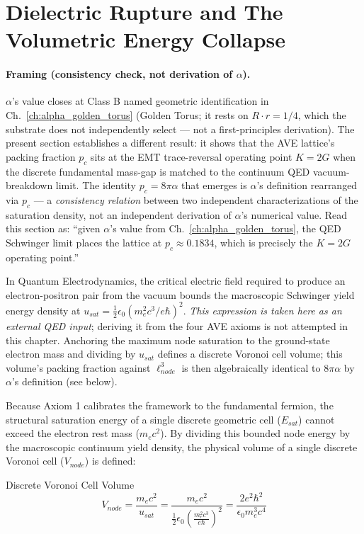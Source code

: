 \section{Dielectric Rupture and The Volumetric Energy Collapse}
\label{sec:dielectric_rupture}

\paragraph{Framing (consistency check, not derivation of $\alpha$).} $\alpha$'s value closes at Class B named geometric identification in Ch.~\ref{ch:alpha_golden_torus} (Golden Torus; it rests on $R \cdot r = 1/4$, which the substrate does not independently select --- not a first-principles derivation). The present section establishes a different result: it shows that the AVE lattice's packing fraction $p_c$ sits at the EMT trace-reversal operating point $K = 2G$ when the discrete fundamental mass-gap is matched to the continuum QED vacuum-breakdown limit. The identity $p_c = 8\pi\alpha$ that emerges is $\alpha$'s definition rearranged via $p_c$ --- a \emph{consistency relation} between two independent characterizations of the saturation density, not an independent derivation of $\alpha$'s numerical value. Read this section as: ``given $\alpha$'s value from Ch.~\ref{ch:alpha_golden_torus}, the QED Schwinger limit places the lattice at $p_c \approx 0.1834$, which is precisely the $K=2G$ operating point.''

In Quantum Electrodynamics, the critical electric field required to produce an electron-positron pair from the vacuum bounds the macroscopic Schwinger yield energy density at $u_{sat} = \frac{1}{2} \epsilon_0 (m_e^2 c^3 / e \hbar)^2$. \emph{This expression is taken here as an external QED input}; deriving it from the four AVE axioms is not attempted in this chapter. Anchoring the maximum node saturation to the ground-state electron mass and dividing by $u_{sat}$ defines a discrete Voronoi cell volume; this volume's packing fraction against $\ell_{node}^3$ is then algebraically identical to $8\pi\alpha$ by $\alpha$'s definition (see below).

Because Axiom 1 calibrates the framework to the fundamental fermion, the structural saturation energy of a single discrete geometric cell ($E_{sat}$) cannot exceed the electron rest mass ($m_e c^2$). By dividing this bounded node energy by the macroscopic continuum yield density, the physical volume of a single discrete Voronoi cell ($V_{node}$) is defined:
\begin{resultbox}{Discrete Voronoi Cell Volume}
\begin{equation}
    V_{node} = \frac{m_e c^2}{u_{sat}} = \frac{m_e c^2}{\frac{1}{2} \epsilon_0 \left( \frac{m_e^2 c^3}{e \hbar} \right)^2} = \frac{2 e^2 \hbar^2}{\epsilon_0 m_e^3 c^4}
\end{equation}
\end{resultbox}

